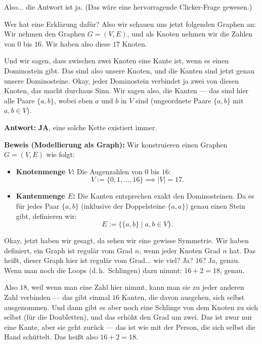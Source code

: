 \begin{spoken-clean}[00:26:25 - 00:28:18]
Also... die Antwort ist ja.  (Das wäre eine hervorragende Clicker-Frage gewesen.)

Wer hat eine Erklärung dafür? Also wir schauen uns jetzt folgenden Graphen an: Wir nehmen den Graphen $G = (V, E)$, und als Knoten nehmen wir die Zahlen von $0$ bis $16$. Wir haben also diese $17$ Knoten. 

Und wir sagen, dass zwischen zwei Knoten eine Kante ist, wenn es einen Dominostein gibt. Das sind also unsere Knoten, und die Kanten sind jetzt genau unsere Dominosteine. Okay, jeder Dominostein verbindet ja zwei von diesen Knoten, das macht durchaus Sinn. Wir sagen also, die Kanten --- das sind hier alle Paare $\{a, b\}$, wobei eben $a$ und $b$ in $V$ sind (ungeordnete Paare $\{a, b\}$ mit $a, b \in V$). 
\end{spoken-clean}

\begin{math-stroke}
\textbf{Antwort:} \textbf{JA}, eine solche Kette existiert immer.

\textbf{Beweis (Modellierung als Graph):}
Wir konstruieren einen Graphen $G = (V, E)$ wie folgt:
\begin{itemize}
    \item \textbf{Knotenmenge $V$:} Die Augenzahlen von $0$ bis $16$:
    \[
    V := \{0, 1, \dots, 16\} \implies |V| = 17.
    \]
    \item \textbf{Kantenmenge $E$:} Die Kanten entsprechen exakt den Dominosteinen. Da es für jedes Paar $\{a, b\}$ (inklusive der Doppelsteine $\{a, a\}$) genau einen Stein gibt, definieren wir:
    \[
    E := \bigl\{ \{a, b\} \;\big|\; a, b \in V \bigr\}.
    \]
\end{itemize}
\end{math-stroke}

\begin{spoken-clean}[00:28:18 - 00:29:55]
Okay, jetzt haben wir gesagt, da sehen wir eine gewisse Symmetrie. Wir haben definiert, ein Graph ist regulär vom Grad $n$, wenn jeder Knoten Grad $n$ hat. Das heißt, dieser Graph hier ist regulär vom Grad... wie viel? Ja? $16$? Ja, genau. Wenn man noch die Loops (d.\,h.\ Schlingen) dazu nimmt: $16 + 2 = 18$, genau. 

Also $18$, weil wenn man eine Zahl hier nimmt, kann man sie zu jeder anderen Zahl verbinden --- das gibt einmal $16$ Kanten, die davon ausgehen, sich selbst ausgenommen. Und dann gibt es aber noch eine Schlinge von dem Knoten zu sich selbst (für die Doubletten), und das erhöht den Grad um zwei. Das ist zwar nur eine Kante, aber sie geht zurück --- das ist wie mit der Person, die sich selbst die Hand schüttelt. Das heißt also $16 + 2 = 18$.
\end{spoken-clean}

